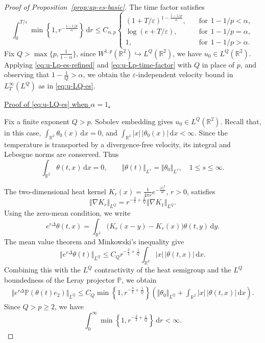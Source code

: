 \documentclass[reqno,11pt,a4paper]{amsart}
\newcommand{\dd}{\mathrm{d}}
\begin{document}
\begin{proof}[Proof of Proposition~\ref{prop:ap-es-basic}]
The time factor satisfies
\begin{equation}\label{eq:u-Lp-time-factor}
  \int_0^{T/\varepsilon}
    \min\left\{1,r^{-\frac{1-1/p}{\alpha}}\right\}\,\dd r
  \leq C_{\alpha,p}
  \begin{cases}
    (1+T/\varepsilon)^{1-\frac{1-1/p}{\alpha}},
      &\quad \textrm{for}\;\, 1-1/p<\alpha,\\[1mm]
    \log(e+T/\varepsilon),
      & \quad \textrm{for}\;\, 1-1/p=\alpha,\\[1mm]
    1,
      & \quad \textrm{for}\;\, 1-1/p>\alpha.
  \end{cases}
\end{equation}
Fix
$Q>\max\{p,\frac{1}{1-\alpha}\}$, since
$W^{1,p}(\mathbb{R}^2)\hookrightarrow L^Q(\mathbb{R}^2)$,
we have $u_0\in L^Q(\mathbb{R}^2)$. Applying
\eqref{eq:u-Lp-es-refined} and \eqref{eq:u-Lp-time-factor}
with $Q$ in place of $p$, and observing that
$1-\frac{1}{Q}>\alpha$, we obtain the $\varepsilon$-independent velocity bound in
$L^\infty_T(L^Q)$ as in \eqref{eq:u-LQ-es}.

\medskip
\underline{Proof of \eqref{eq:u-LQ-es} when $\alpha=1$.}

Fix a finite exponent $Q>p$.
Sobolev embedding gives $u_0\in L^Q(\mathbb R^2)$.
Recall that, in this case,
$\int_{\mathbb R^2}\theta_0(x)\,\dd x=0$,
and $\int_{\mathbb R^2}|x|\,|\theta_0(x)|\,\dd x<\infty$.
Since the temperature is transported by a divergence-free
velocity, its integral and Lebesgue norms are conserved.
Thus
\[
  \int_{\mathbb R^2}\theta(t,x)\,\dd x=0,
  \qquad
  \Vert \theta(t)\Vert _{L^s}=\Vert \theta_0\Vert _{L^s},
  \quad 1\leq s\leq\infty.
\]

The two-dimensional heat kernel
$K_r(x)=\frac1{4\pi r}e^{-\frac{|x|^2}{4r}}$, $r>0$,
satisfies
\[
  \Vert \nabla K_r\Vert _{L^Q}
  =r^{-\frac32+\frac1Q}\Vert \nabla K_1\Vert _{L^Q}.
\]
Using the zero-mean condition, we write
\[
  e^{r\Delta}\theta(t,x)
  =
  \int_{\mathbb R^2}
  \bigl(K_r(x-y)-K_r(x)\bigr)\theta(t,y)\,\dd y.
\]
The mean value theorem and Minkowski's inequality give
\[
  \Vert e^{r\Delta}\theta(t)\Vert _{L^Q}
  \leq
  C_Qr^{-\frac32+\frac1Q}
  \int_{\mathbb R^2}|x|\,|\theta(t,x)|\,\dd x.
\]
Combining this with the $L^Q$ contractivity of the heat
semigroup and the $L^Q$ boundedness of the Leray projector $\mathbb P$, we obtain
\begin{equation}\label{eq:alpha-one-semigroup}
\begin{aligned}
  \bigl\Vert 
    e^{r\Delta}\mathbb P(\theta(t)e_2)
  \bigr\Vert _{L^Q}
  \leq {}
  C_Q\min\left\{1,r^{-\frac32+\frac1Q}\right\}
  \left(
    \Vert \theta_0\Vert _{L^Q}
    +\int_{\mathbb R^2}|x|\,|\theta(t,x)|\,\dd x
  \right).
\end{aligned}
\end{equation}
Since $Q>p\geq2$, we have
\begin{equation}\label{eq:alpha-one-time-integrability}
  \int_0^\infty
  \min\left\{1,r^{-\frac32+\frac1Q}\right\}\,\dd r
  <\infty.
\end{equation}


\end{proof}
\end{document}

